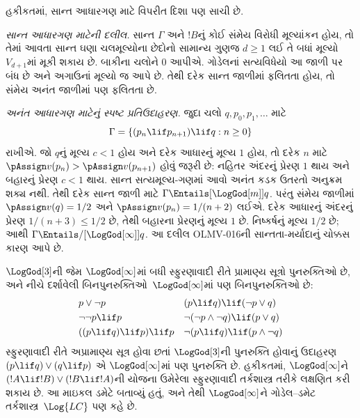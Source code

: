 હકીકતમાં, સાન્ત આધારગણ માટે વિપરીત દિશા પણ સાચી છે.

\emph{સાન્ત આધારગણ માટેની દલીલ.}
સાન્ત $\Gamma$ અને $!B$નું કોઈ સંમેય વિરોધી મૂલ્યાંકન હોય,
તો તેમાં આવતા સાન્ત ઘણા ચલમૂલ્યોના છેદોનો સામાન્ય
ગુણજ $d\ge1$ લઈ તે બધાં મૂલ્યો $V_{d+1}$માં મૂકી શકાય છે.
બાકીના ચલોને $0$ આપીએ. ગોડેલનાં સત્યવિધેયો આ જાળી પર
બંધ છે અને અગાઉનાં મૂલ્યો જ આપે છે. તેથી દરેક સાન્ત
જાળીમાં ફલિતતા હોય, તો સંમેય અનંત જાળીમાં પણ ફલિતતા છે.

\emph{અનંત આધારગણ માટેનું સ્પષ્ટ પ્રતિઉદાહરણ.}
જુદા ચલો $q,p_0,p_1,\ldots$ માટે
\[
 \Gamma=\{(p_n\lif p_{n+1})\lif q:n\ge0\}
\]
રાખીએ. જો $q$નું મૂલ્ય $c<1$ હોય અને દરેક આધારનું
મૂલ્ય $1$ હોય, તો દરેક $n$ માટે
$\pAssign v(p_n)>\pAssign v(p_{n+1})$ હોવું જરૂરી છે:
નહિતર અંદરનું પ્રેરણ $1$ થાય અને બહારનું પ્રેરણ $c<1$ થાય.
સાન્ત સત્યમૂલ્ય-ગણમાં આવો અનંત કડક ઉતરતો અનુક્રમ શક્ય નથી.
તેથી દરેક સાન્ત જાળી માટે $\Gamma\Entails[\LogGod[m]]q$.
પરંતુ સંમેય જાળીમાં
$\pAssign v(q)=1/2$ અને $\pAssign v(p_n)=1/(n+2)$ લઈએ.
દરેક આધારનું અંદરનું પ્રેરણ $1/(n+3)\le1/2$ છે, તેથી
બહારના પ્રેરણનું મૂલ્ય $1$ છે. નિષ્કર્ષનું મૂલ્ય $1/2$ છે;
આથી $\Gamma\Entails/[\LogGod[\infty]]q$.
આ દલીલ OLMV-016ની સાન્તતા-મર્યાદાનું ચોક્કસ કારણ આપે છે.

$\LogGod[3]$ની જેમ $\LogGod[\infty]$માં બધી સ્ફુરણાવાદી રીતે
પ્રામાણ્ય સૂત્રો પુનરુક્તિઓ છે, અને નીચે દર્શાવેલી
બિનપુનરુક્તિઓ~$\LogGod[\infty]$માં પણ બિનપુનરુક્તિઓ છે:
\begin{align*}
  & p \lor \lnot p && (p \lif q) \lif (\lnot p \lor q) \\
  & \lnot\lnot p \lif p && \lnot(\lnot p \land \lnot q) \lif (p \lor q) \\
  & ((p \lif q) \lif p) \lif p && \lnot(p \lif q) \lif (p \land \lnot q)
\end{align*}
સ્ફુરણાવાદી રીતે અપ્રામાણ્ય સૂત્ર હોવા છતાં $\LogGod[3]$ની પુનરુક્તિ
હોવાનું ઉદાહરણ $(p \lif q) \lor (q \lif p)$ એ
$\LogGod[\infty]$માં પણ પુનરુક્તિ છે. હકીકતમાં,
$\LogGod[\infty]$ને $(!A \lif !B) \lor (!B \lif !A)$ની
યોજના ઉમેરેલા સ્ફુરણાવાદી તર્કશાસ્ત્ર તરીકે લક્ષણિત
કરી શકાય છે. આ માઇકલ ડમેટે બતાવ્યું હતું, અને તેથી
$\LogGod[\infty]$ને ગોડેલ--ડમેટ તર્કશાસ્ત્ર~$\Log{LC}$ પણ કહે છે.

